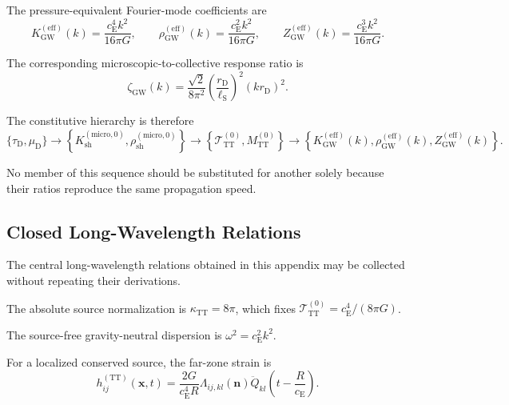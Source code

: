 The pressure-equivalent Fourier-mode coefficients are
\begin{equation}
    K_{\mathrm{GW}}^{(\mathrm{eff})}(k) = \frac{ c_{\mathrm{E}}^{4}k^{2} }{ 16\pi G }, \qquad \rho_{\mathrm{GW}}^{(\mathrm{eff})}(k) = \frac{ c_{\mathrm{E}}^{2}k^{2} }{ 16\pi G }, \qquad Z_{\mathrm{GW}}^{(\mathrm{eff})}(k) = \frac{ c_{\mathrm{E}}^{3}k^{2} }{ 16\pi G }.
\end{equation}

The corresponding microscopic-to-collective response ratio is
\begin{equation}
    \zeta_{\mathrm{GW}}(k) = \frac{ \sqrt{2} }{ 8\pi^{2} } \left( \frac{ r_{\mathrm{D}} }{ \ell_{\mathrm{S}} } \right)^{2} \left( kr_{\mathrm{D}} \right)^{2}.
    \label{eq:n12_zeta}
\end{equation}

The constitutive hierarchy is therefore
\begin{equation}
    \{\tau_{\mathrm{D}},\mu_{\mathrm{D}}\} \longrightarrow \left\{ K_{\mathrm{sh}}^{(\mathrm{micro},0)}, \rho_{\mathrm{sh}}^{(\mathrm{micro},0)} \right\} \longrightarrow \left\{ \mathcal{T}_{\mathrm{TT}}^{(0)}, M_{\mathrm{TT}}^{(0)} \right\} \longrightarrow \left\{ K_{\mathrm{GW}}^{(\mathrm{eff})}(k), \rho_{\mathrm{GW}}^{(\mathrm{eff})}(k), Z_{\mathrm{GW}}^{(\mathrm{eff})}(k) \right\}.
    \label{eq:n12_coefficient_hierarchy}
\end{equation}

No member of this sequence should be substituted for another solely because their ratios reproduce the same propagation speed.

\subsection{Closed Long-Wavelength Relations}
\label{subsec:n12_closed_relations}

The central long-wavelength relations obtained in this appendix may be collected without repeating their derivations.

The absolute source normalization is $\kappa_{\mathrm{TT}} = 8\pi$, which fixes $\mathcal{T}_{\mathrm{TT}}^{(0)} = c_{\mathrm{E}}^{4} / (8\pi G)$.

The source-free gravity-neutral dispersion is $\omega^{2} = c_{\mathrm{E}}^{2}k^{2}$.

For a localized conserved source, the far-zone strain is
\begin{equation}
    h_{ij}^{(\mathrm{TT})} (\mathbf{x},t) = \frac{ 2G }{ c_{\mathrm{E}}^{4}R } \Lambda_{ij,kl}(\mathbf{n}) \ddot{Q}_{kl} \left( t-\frac{R}{c_{\mathrm{E}}} \right).
\end{equation}

